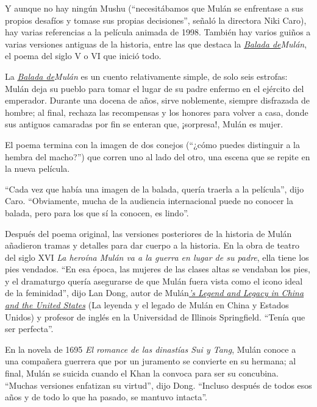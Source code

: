 Y aunque no hay ningún Mushu (``necesitábamos que Mulán se enfrentase a
sus propios desafíos y tomase sus propias decisiones'', señaló la
directora Niki Caro), hay varias referencias a la película animada de
1998. También hay varios guiños a varias versiones antiguas de la
historia, entre las que destaca la
\href{https://es.wikipedia.org/wiki/Hua_Mulan}{\emph{Balada
de}}\emph{Mulán}, el poema del siglo V o VI que inició todo.

La
\href{https://en.wikisource.org/wiki/Translation:Ballad_of_Mulan}{\emph{Balada
de}}\emph{Mulán} es un cuento relativamente simple, de solo seis
estrofas: Mulán deja su pueblo para tomar el lugar de su padre enfermo
en el ejército del emperador. Durante una docena de años, sirve
noblemente, siempre disfrazada de hombre; al final, rechaza las
recompensas y los honores para volver a casa, donde sus antiguos
camaradas por fin se enteran que, ¡sorpresa!, Mulán es mujer.

El poema termina con la imagen de dos conejos (``¿cómo puedes distinguir
a la hembra del macho?'') que corren uno al lado del otro, una escena
que se repite en la nueva película.

``Cada vez que había una imagen de la balada, quería traerla a la
película'', dijo Caro. ``Obviamente, mucha de la audiencia internacional
puede no conocer la balada, pero para los que sí la conocen, es lindo''.

Después del poema original, las versiones posteriores de la historia de
Mulán añadieron tramas y detalles para dar cuerpo a la historia. En la
obra de teatro del siglo XVI \emph{La heroína Mulán va a la guerra en
lugar de su padre}, ella tiene los pies vendados. ``En esa época, las
mujeres de las clases altas se vendaban los pies, y el dramaturgo quería
asegurarse de que Mulán fuera vista como el icono ideal de la
feminidad'', dijo Lan Dong, autor de
Mulán\href{https://muse.jhu.edu/book/9786}{\emph{'s Legend and Legacy in
China and the United States}} (La leyenda y el legado de Mulán en China
y Estados Unidos) y profesor de inglés en la Universidad de Illinois
Springfield. ``Tenía que ser perfecta''.

En la novela de 1695 \emph{El romance de las dinastías Sui y Tang},
Mulán conoce a una compañera guerrera que por un juramento se convierte
en su hermana; al final, Mulán se suicida cuando el Khan la convoca para
ser su concubina. ``Muchas versiones enfatizan su virtud'', dijo Dong.
``Incluso después de todos esos años y de todo lo que ha pasado, se
mantuvo intacta''.


